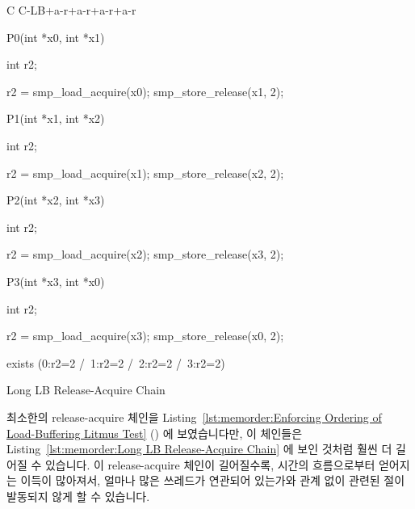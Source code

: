 \begin{listing}[tbp]
{ \scriptsize
\begin{verbbox}[\LstLineNo]
C C-LB+a-r+a-r+a-r+a-r
{
}

P0(int *x0, int *x1)
{
  int r2;

  r2 = smp_load_acquire(x0);
  smp_store_release(x1, 2);
}


P1(int *x1, int *x2)
{
  int r2;

  r2 = smp_load_acquire(x1);
  smp_store_release(x2, 2);
}

P2(int *x2, int *x3)
{
  int r2;

  r2 = smp_load_acquire(x2);
  smp_store_release(x3, 2);
}

P3(int *x3, int *x0)
{
  int r2;

  r2 = smp_load_acquire(x3);
  smp_store_release(x0, 2);
}

exists (0:r2=2 /\ 1:r2=2 /\ 2:r2=2 /\ 3:r2=2)
\end{verbbox}
}
\centering
\theverbbox
\caption{Long LB Release-Acquire Chain}
\label{lst:memorder:Long LB Release-Acquire Chain}
\end{listing}

최소한의 release-acquire 체인을
Listing~\ref{lst:memorder:Enforcing Ordering of Load-Buffering Litmus Test}
()
에 보였습니다만, 이 체인들은
Listing~\ref{lst:memorder:Long LB Release-Acquire Chain}
에 보인 것처럼 훨씬 더 길어질 수 있습니다.
이 release-acquire 체인이 길어질수록, 시간의 흐름으로부터 얻어지는 이득이
많아져서, 얼마나 많은 쓰레드가 연관되어 있는가와 관계 없이 관련된 
절이 발동되지 않게 할 수 있습니다.

